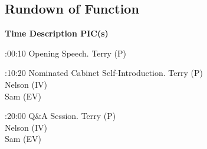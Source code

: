 \subsection{Rundown of Function}

\setupTABLE[c][1][width=1.25in]
\setupTABLE[c][2][width=3.5in]
\setupTABLE[c][3][width=1.25in]
\bTABLE
\bTABLEhead

\bTR\bTH    \bf{Time}
\eTH\bTH    \bf{Description}
\eTH\bTH    \bf{PIC(s)}
\eTH\eTR

\eTABLEhead
\bTABLEbody

\bTR{}:00:10
\eTD\bTD Opening Speech.
\eTD\bTD Terry (P)
\eTD\eTR

\bTR{}:10:20
\eTD\bTD Nominated Cabinet Self-Introduction.
\eTD\bTD Terry (P) \\ Nelson (IV) \\ Sam (EV)
\eTD\eTR

\bTR{}:20:00
\eTD\bTD Q\&A Session.
\eTD\bTD Terry (P) \\ Nelson (IV) \\ Sam (EV)
\eTD\eTR

\eTABLEbody
\eTABLE

\stopsection
\pagebreak
